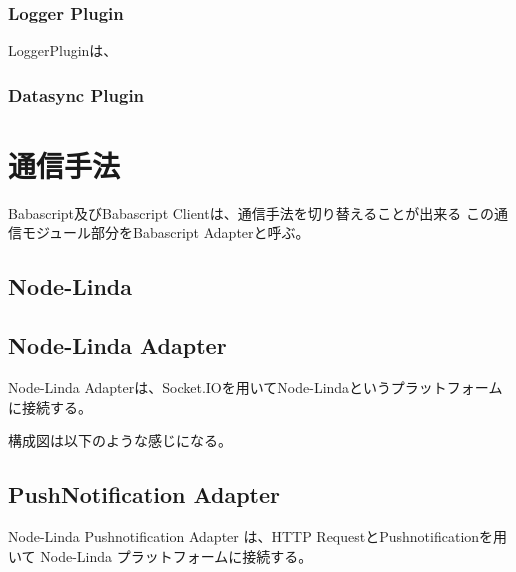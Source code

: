 \subsubsection{Logger Plugin}

LoggerPluginは、

\subsubsection{Datasync Plugin}


\section{通信手法}

Babascript及びBabascript Clientは、通信手法を切り替えることが出来る
この通信モジュール部分をBabascript Adapterと呼ぶ。


\subsection{Node-Linda}

\subsection{Node-Linda Adapter}

Node-Linda Adapterは、Socket.IOを用いてNode-Lindaというプラットフォームに接続する。

構成図は以下のような感じになる。

\subsection{PushNotification Adapter}

Node-Linda Pushnotification Adapter は、HTTP RequestとPushnotificationを用いて
Node-Linda プラットフォームに接続する。
